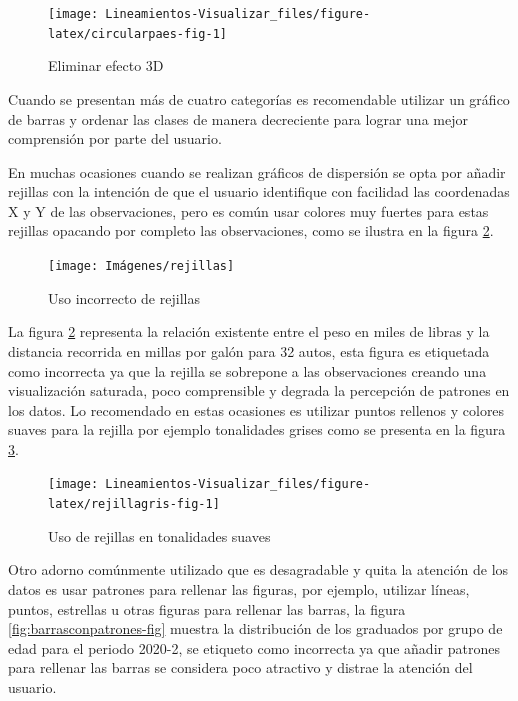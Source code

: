 \documentclass[
]{book}
\begin{document}
\begin{figure}

{\centering \texttt{[image: Lineamientos-Visualizar\_files/figure-latex/circularpaes-fig-1]} 

}

\caption{Eliminar efecto 3D}\label{fig:circularpaes-fig}
\end{figure}

Cuando se presentan más de cuatro categorías es recomendable utilizar un gráfico de barras y ordenar las clases de manera decreciente para lograr una mejor comprensión por parte del usuario.

En muchas ocasiones cuando se realizan gráficos de dispersión se opta por añadir rejillas con la intención de que el usuario identifique con facilidad las coordenadas X y Y de las observaciones, pero es común usar colores muy fuertes para estas rejillas opacando por completo las observaciones, como se ilustra en la figura \ref{fig:usoderejillas-fig}.

\begin{figure}

{\centering \texttt{[image: Imágenes/rejillas]} 

}

\caption{Uso incorrecto de rejillas}\label{fig:usoderejillas-fig}
\end{figure}

La figura \ref{fig:usoderejillas-fig} representa la relación existente entre el peso en miles de libras y la distancia recorrida en millas por galón para 32 autos, esta figura es etiquetada como incorrecta ya que la rejilla se sobrepone a las observaciones creando una visualización saturada, poco comprensible y degrada la percepción de patrones en los datos. Lo recomendado en estas ocasiones es utilizar puntos rellenos y colores suaves para la rejilla por ejemplo tonalidades grises como se presenta en la figura \ref{fig:rejillagris-fig}.

\begin{figure}

{\centering \texttt{[image: Lineamientos-Visualizar\_files/figure-latex/rejillagris-fig-1]} 

}

\caption{Uso de rejillas en tonalidades suaves}\label{fig:rejillagris-fig}
\end{figure}

Otro adorno comúnmente utilizado que es desagradable y quita la atención de los datos es usar patrones para rellenar las figuras, por ejemplo, utilizar líneas, puntos, estrellas u otras figuras para rellenar las barras, la figura \ref{fig:barrasconpatrones-fig} muestra la distribución de los graduados por grupo de edad para el periodo 2020-2, se etiqueto como incorrecta ya que añadir patrones para rellenar las barras se considera poco atractivo y distrae la atención del usuario.
\end{document}
